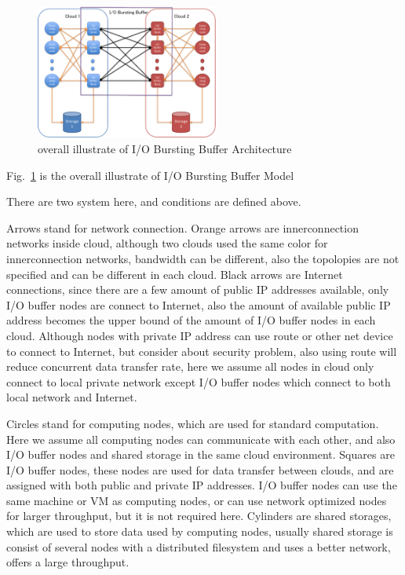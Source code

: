 \documentclass[JIP,draft]{ipsj}
\begin{document}
\begin{figure}[tb]
	\centering
	\includegraphics[width=6cm]{overview}
	\caption{overall illustrate of I/O Bursting Buffer Architecture}
	\label{overview}
\end{figure}

Fig.~\ref{overview} is the overall illustrate of I/O Bursting Buffer Model

There are two system here, and conditions are defined above.

Arrows stand for network connection.
Orange arrows are innerconnection networks inside cloud, although two clouds used the same color for innerconnection networks, bandwidth can be different, also the topolopies are not specified and can be different in each cloud.
Black arrows are Internet connections, since there are a few amount of public IP addresses available, only I/O buffer nodes are connect to Internet, also the amount of available public IP address becomes the upper bound of the amount of I/O buffer nodes in each cloud. 
Although nodes with private IP address can use route or other net device to connect to Internet, but consider about security problem, also using route will reduce concurrent data transfer rate, here we assume all nodes in cloud only connect to local private network except I/O buffer nodes which connect to both local network and Internet.

Circles stand for computing nodes, which are used for standard computation.
Here we assume all computing nodes can communicate with each other, and also I/O buffer nodes and shared storage in the same cloud environment.
Squares are I/O buffer nodes, these nodes are used for data transfer between clouds, and are assigned with both public and private IP addresses.
I/O buffer nodes can use the same machine or VM as computing nodes, or can use network optimized nodes for larger throughput, but it is not required here.
Cylinders are shared storages, which are used to store data used by computing nodes, usually shared storage is consist of several nodes with a distributed filesystem and uses a better network, offers a large throughput.
\end{document}

